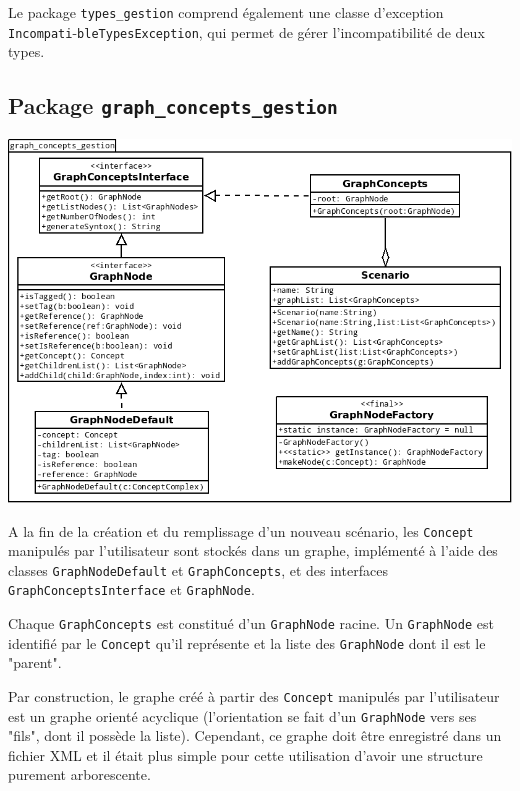 \documentclass[12pt]{report}
\begin{document}
\bigskip

Le package \texttt{types\_gestion} comprend également une classe d'exception \texttt{Incompati}-\texttt{bleTypesException}, qui permet de gérer l'incompatibilité de deux types.

\subsection{Package \texttt{graph\_concepts\_gestion}}

\begin{center}
\includegraphics[scale=0.5]{DiagLinguistic_graph_concepts_gestion.png}
\end{center}

A la fin de la création et du remplissage d'un nouveau scénario, les \texttt{Concept} manipulés par l'utilisateur sont stockés dans un graphe, implémenté à l'aide des classes \texttt{GraphNodeDefault} et \texttt{GraphConcepts}, et des interfaces \texttt{GraphConceptsInterface} et \texttt{GraphNode}.

Chaque \texttt{GraphConcepts} est constitué d'un \texttt{GraphNode} racine. Un \texttt{GraphNode} est identifié par le \texttt{Concept} qu'il représente et la liste des \texttt{GraphNode} dont il est le "parent".

\bigskip

Par construction, le graphe créé à partir des \texttt{Concept} manipulés par l'utilisateur est un graphe orienté acyclique (l'orientation se fait d'un \texttt{GraphNode} vers ses "fils", dont il possède la liste). Cependant, ce graphe doit être enregistré dans un fichier XML et il était plus simple pour cette utilisation d'avoir une structure purement arborescente. 
\end{document}
